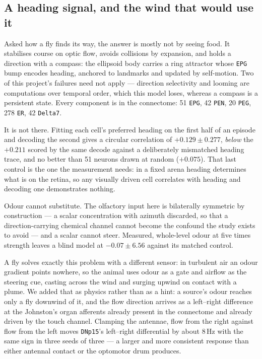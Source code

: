 \documentclass[10pt,twoside]{article}
\newcommand{\cell}[1]{\texttt{#1}}
\begin{document}
\subsection{A heading signal, and the wind that would use it}
\label{sec:compass}

Asked how a fly finds its way, the answer is mostly not by seeing food. It
stabilises course on optic flow, avoids collisions by expansion, and holds a
direction with a compass: the ellipsoid body carries a ring attractor whose
\cell{EPG} bump encodes heading, anchored to landmarks and updated by
self-motion. Two of this project's failures need not apply --- direction
selectivity and looming are computations over temporal order, which this model
loses, whereas a compass is a persistent state. Every component is in the
connectome: 51 \cell{EPG}, 42 \cell{PEN}, 20 \cell{PEG}, 278 \cell{ER}, 42
\cell{Delta7}.

It is not there. Fitting each cell's preferred heading on the first half of an
episode and decoding the second gives a circular correlation of
$+0.129\pm0.277$, \emph{below} the $+0.211$ scored by the same decode against a
deliberately mismatched heading trace, and no better than 51 neurons drawn at
random ($+0.075$). That last control is the one the measurement needs: in a
fixed arena heading determines what is on the retina, so any visually driven
cell correlates with heading and decoding one demonstrates nothing.

Odour cannot substitute. The olfactory input here is bilaterally symmetric by
construction --- a scalar concentration with azimuth discarded, so that a
direction-carrying chemical channel cannot become the confound the study exists
to avoid --- and a scalar cannot steer. Measured, whole-level odour at five
times strength leaves a blind model at $-0.07\pm6.56$ against its matched
control.

A fly solves exactly this problem with a different sensor: in turbulent air an
odour gradient points nowhere, so the animal uses odour as a gate and airflow
as the steering cue, casting across the wind and surging upwind on contact with
a plume. We added that as physics rather than as a hint: a source's odour
reaches only a fly downwind of it, and the flow direction arrives as a
left--right difference at the Johnston's organ afferents already present in the
connectome and already driven by the touch channel. Clamping the antennae, flow
from the right against flow from the left moves \cell{DNp15}'s left--right
differential by about 8\,Hz with the same sign in three seeds of three --- a
larger and more consistent response than either antennal contact or the
optomotor drum produces.
\end{document}
